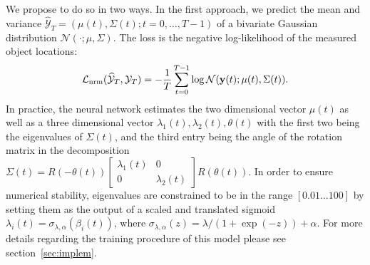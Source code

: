 We propose to do so in two ways. In the first approach, we predict the mean and variance $\widehat{\mathcal{Y}}_T=(\mu(t),\Sigma(t);t=0,\dots,T-1)$ of a bivariate Gaussian distribution $\mathcal{N}(\cdot;\mu,\Sigma)$. The loss is the negative log-likelihood of the measured object locations:
\vnudgeeq
\[
 \lossnormal(\widehat{\mathcal{Y}}_T,\mathcal{Y}_T)
   = - \frac{1}{T} \sum_{t=0}^{T-1} \log \mathcal{N}(\by(t); \mu(t),\Sigma(t)).
\vnudgeeq
\]
In practice, the neural network estimates the two dimensional vector $\mu(t)$ as well as a three dimensional vector $\lambda_1(t), \lambda_2(t), \theta(t)$ with the first two  being the eigenvalues of $\Sigma(t)$, and the third entry being the angle of the rotation matrix in the decomposition $\Sigma(t) = R(-\theta(t)) \begin{bmatrix}
    \lambda_1(t) & 0\\
         0 & \lambda_2(t) 
\end{bmatrix}R(\theta(t))$. In order to ensure numerical stability, eigenvalues are constrained to be in the range $[0.01 \ldots 100]$ by setting them as the output of a scaled and translated sigmoid $\lambda_i(t) = \sigma_{\lambda,\alpha}(\beta_i(t))$, where $\sigma_{\lambda,\alpha}(z) = \lambda/(1 + \exp(-z)) + \alpha$.
%
%
For more details regarding the training procedure of this model please see section~\ref{sec:implem}.

